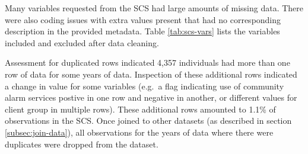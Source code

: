 \documentclass[]{article}
\begin{document}
Many variables requested from the SCS had large amounts of missing data.
There were also coding issues with extra values present that had no
corresponding description in the provided metadata. Table
\ref{tab:scs-vars} lists the variables included and excluded after data
cleaning.

Assessment for duplicated rows indicated 4,357 individuals had more than
one row of data for some years of data. Inspection of these additional
rows indicated a change in value for some variables (e.g.~a flag
indicating use of community alarm services postive in one row and
negative in another, or different values for client group in multiple
rows). These additional rows amounted to 1.1\% of observations in the
SCS. Once joined to other datasets (as described in section
\ref{subsec:join-data}), all observations for the years of data where
there were duplicates were dropped from the dataset.

\begin{table}[]
\caption{Social Care Survey file data}
\label{tab:scs-vars}
\end{table}
\end{document}
